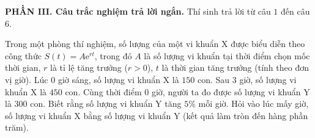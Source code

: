 \noindent\textbf{PHẦN III. Câu trắc nghiệm trả lời ngắn.} Thí sinh trả lời từ câu $1$ đến câu $6$.
\setcounter{ex}{0}
\begin{ex} %
	Trong một phòng thí nghiệm, số lượng của một vi khuẩn X được biểu diễn theo công thức $S(t)=A\mathrm{e}^{rt}$, trong đó $A$ là số lượng vi khuẩn tại thời điểm chọn mốc thời gian, $r$ là tỉ lệ tăng trưởng ($r>0$), $t$ là thời gian tăng trưởng (tính theo đơn vị giờ). Lúc $0$ giờ sáng, số lượng vi khuẩn X là $150$ con. Sau $3$ giờ, số lượng vi khuẩn X là $450$ con. Cùng thời điểm $0$ giờ, người ta đo được số lượng vi khuẩn Y là $300$ con. Biết rằng số lượng vi khuẩn Y tăng $5\%$ mỗi giờ. Hỏi vào lúc mấy giờ, số lượng vi khuẩn X bằng số lượng vi khuẩn Y (kết quả làm tròn đến hàng phần trăm).
	\par {}
\end{ex}

